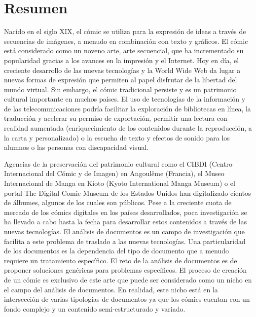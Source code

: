 \chapter*{Resumen}

Nacido en el siglo XIX, el cómic se utiliza para la expresión de ideas a través de secuencias de imágenes, a menudo en combinación con texto y gráficos. 
El cómic está considerado como un noveno arte, arte secuencial, que ha incrementado su popularidad gracias a los avances en la impresión y el Internet.
Hoy en día, el creciente desarrollo de las nuevas tecnologías y la World Wide Web da lugar a nuevas formas de expresión que permiten al papel disfrutar de la libertad del mundo virtual.
Sin embargo, el cómic tradicional persiste y es un patrimonio cultural importante en muchos países.
El uso de tecnologías de la información y de las telecomunicaciones podría facilitar la exploración de bibliotecas en línea, la traducción y acelerar su permiso de exportación, permitir una lectura con realidad aumentada (enriquecimiento de los contenidos durante la reproducción, a la carta y personalizado) o la escucha de texto y efectos de sonido para los alumnos o las personas con discapacidad visual.

Agencias de la preservación del patrimonio cultural como el CIBDI (Centro Internacional del Cómic y de Imagen) en Angoulême (Francia), el Museo Internacional de Manga en Kioto (Kyoto International Manga Museum) o el portal The Digital Comic Museum de los Estados Unidos han digitalizado cientos de álbumes, algunos de los cuales son públicos.
Pese a la creciente cuota de mercado de los cómics digitales en los países desarrollados, poca investigación se ha llevado a cabo hasta la fecha para desarrollar estos contenidos a través de las nuevas tecnologías.
El análisis de documentos es un campo de investigación que facilita a este problema de traslado a las nuevas tecnologías.
Una particularidad de los documentos es la dependencia del tipo de documento que a menudo requiere un tratamiento específico.
El reto de la análisis de documentos es de proponer soluciones genéricas para problemas específicos.
El proceso de creación de un cómic es exclusivo de este arte que puede ser considerado como un nicho en el campo del análisis de documentos.
En realidad, este nicho está en la intersección de varias tipologías de documentos ya que los cómics cuentan con un fondo complejo y un contenido semi-estructurado y variado.

